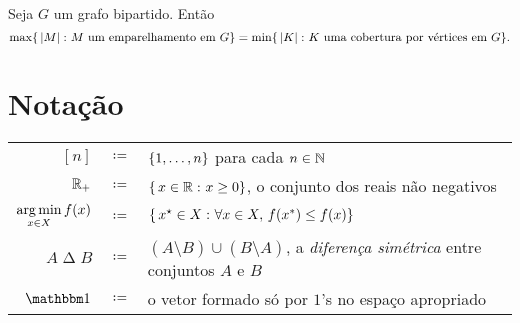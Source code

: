 \documentclass[10pt,reqno]{amsart}
\begin{document}
\begin{corollary}
  Seja \(G\) um grafo bipartido.  Então
  \begin{equation}
    \label{eq:18}
    \max\{\,{
      \lvert M\rvert
    }\,\colon{
      \text{\(M\) um emparelhamento em \(G\)}
    }\}
    =
    \min\{\,{
      \lvert K\rvert
    }\,\colon{
      \text{\(K\) uma cobertura por vértices em \(G\)}
    }\}.
  \end{equation}
\end{corollary}


\appendix

\section{Notação}

\bgroup
\renewcommand{\arraystretch}{1.2}
\begin{table}[!ht]
  \centering
  \begin{tabular}{r c p{12cm} }
    \toprule
    \([n]\)
    & \(\coloneqq\) &
    \(\{1,\dotsc,n\}\) para cada \(n \in \mathbb{N}\)
    \\
    \(\mathbb{R}_+\)
    & \(\coloneqq\) &
    \(\{\,{x \in \mathbb{R}}\,\colon{x \geq 0}\}\), o conjunto dos reais não negativos
    \\
    \(\displaystyle\operatorname*{arg\,min}_{x \in X} f(x)\)
    & \(\coloneqq\) &
    \(\{\,{x^{\star} \in X}\,\colon{\forall x \in X,\,f(x^*) \leq f(x)}\}\)
    \\
    \(A \mathbin{\Delta} B\)
    & \(\coloneqq\) &
    \((A \setminus B) \cup (B \setminus A)\),
    a \emph{diferença simétrica} entre conjuntos \(A\) e \(B\)
    \\
    \(\ones\)
    & \(\coloneqq\) &
    o vetor formado só por \(1\)'s no espaço apropriado
    \\
    \bottomrule
  \end{tabular}
  \label{tbl:special-sets}
\end{table}
\egroup                         %

\nocite{CookCPS98a,Schrijver03a}

\begingroup
\printbibliography
\endgroup
\end{document}
